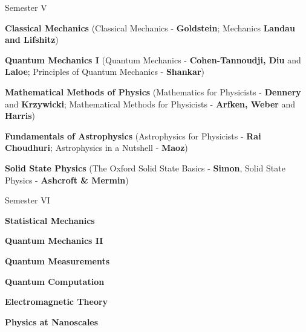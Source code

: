\begin{cventries}
  \cventry
    {Semester V} %
    {} %
    {} %
    {} %
    {
      \begin{cvitems} %
        \item {\textbf{Classical Mechanics} (Classical Mechanics - \textbf{Goldstein}; Mechanics \textbf{Landau and Lifshitz}) }
        \item {\textbf{Quantum Mechanics I} (Quantum Mechanics - \textbf{Cohen-Tannoudji, Diu} and \textbf{Laloe}; Principles of Quantum Mechanics - \textbf{Shankar}) }
        \item {\textbf{Mathematical Methods of Physics} (Mathematics for Physicists - \textbf{Dennery} and \textbf{Krzywicki}; Mathematical Methods for Physicists - \textbf{Arfken, Weber} and \textbf{Harris})}
    	\item {\textbf{Fundamentals of Astrophysics} (Astrophysics for Physicists - \textbf{Rai Choudhuri}; Astrophysics in a Nutshell - \textbf{Maoz})}
    	\item {\textbf{Solid State Physics} (The Oxford Solid State Basics - \textbf{Simon}, Solid State Physics - \textbf{Ashcroft \& Mermin})}
      \end{cvitems}
    }
\cventry
{Semester VI} %
{} %
{} %
{} %
{
	\begin{cvitems} %
		\item {\textbf{Statistical Mechanics}}
		\item {\textbf{Quantum Mechanics II}}
		\item {\textbf{Quantum Measurements}}
		\item {\textbf{Quantum Computation}}
		\item {\textbf{Electromagnetic Theory}}
		\item {\textbf{Physics at Nanoscales}}
	\end{cvitems}
}
\end{cventries}
